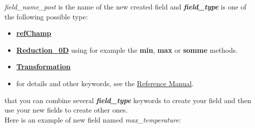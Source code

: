 \begin{itemize}
\textit{field\_name\_post} is the name of the new created field and \textbf{\textit{field\_type}} is one of the following possible type:
\begin{itemize}
\item \href{\REFERENCEMANUAL\#refchamp}{\textbf{refChamp}}
\item \href{\REFERENCEMANUAL\#reduction0d}{\textbf{Reduction\_0D}} using for example the \textbf{min}, \textbf{max} or \textbf{somme} methods.
\item \href{\REFERENCEMANUAL\#transformation}{\textbf{Transformation}}
\item for details and other keywords, see the \href{\REFERENCEMANUAL\#definitionchamps}{\trustref Reference Manual}.
\end{itemize}

\Note that you can combine several \textbf{\textit{field\_type}} keywords to create your field and then use your new fields to create other ones.\\

Here is an example of new field named \textit{max\_temperature}:

\begin{center}
\end{center}
\end{itemize}
